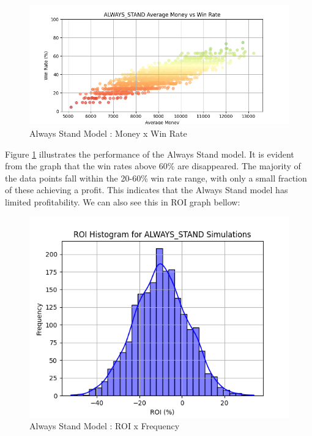 \documentclass[a4paper,12pt]{report}
\begin{document}
\begin{figure}[h]
\begin{center}
\includegraphics[scale=0.6]{figures/graphs/as_money_wr_big.png}
\end{center}
\caption{Always Stand Model : Money x Win Rate}
\label{fig:as_money_wr}
\end{figure}

Figure \ref{fig:as_money_wr} illustrates the performance of the Always Stand model. It is evident from the graph that the win rates above 60\% are disappeared. The majority of the data points fall within the 20-60\% win rate range, with only a small fraction of these achieving a profit. This indicates that the Always Stand model has limited profitability. We can also see this in ROI graph bellow:

\begin{figure}[h]
\begin{center}
\includegraphics[scale=0.6]{figures/graphs/as_roi.png}
\end{center}
\caption{Always Stand Model : ROI x Frequency}
\label{fig:as_roi}
\end{figure}
\end{document}
